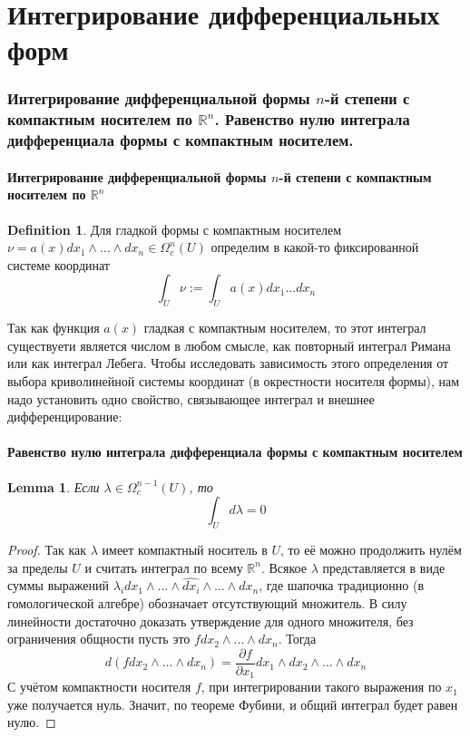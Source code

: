 \documentclass[a4paper,12pt]{article} %
\newtheorem{lemma}[theorem]{Lemma}
\theoremstyle{definition}
\newtheorem{definition}{Definition}[section]
\begin{document}
\part{Интегрирование дифференциальных форм}
\section{Интегрирование дифференциальной формы $n$-й степени с компактным носителем по $\mathbb{R}^n$. Равенство нулю интеграла дифференциала формы с компактным носителем.}
\subsection{Интегрирование дифференциальной формы $n$-й степени с компактным носителем по $\mathbb{R}^n$}
\begin{definition}
	Для гладкой формы с компактным носителем $\nu =a(x)dx_1\wedge \dots \wedge dx_n \in \Omega^n_c(U)$ определим в какой-то фиксированной системе координат
	\begin{equation}
		\int_U \nu :=  \int_U a(x) dx_1 \dots dx_n
	\end{equation}
\end{definition}
Так как функция $a(x)$ гладкая с компактным носителем, то этот интеграл существуети является числом в любом смысле, как повторный интеграл Римана или как интеграл Лебега. Чтобы исследовать зависимость этого определения от выбора криволинейной системы координат (в окрестности носителя формы), нам надо установить одно свойство, связывающее интеграл и внешнее дифференцирование:
\subsection{Равенство нулю интеграла дифференциала формы с компактным носителем}
\begin{lemma}
	Если $\lambda \in \Omega^{n-1}_c(U)$, то
	\begin{equation}
		\int_U d \lambda = 0
	\end{equation}
\end{lemma}
\begin{proof}
	Так как $\lambda$ имеет компактный носитель в $U$, то её можно продолжить нулём за пределы $U$ и считать интеграл по всему $\mathbb{R}^n$. Всякое $\lambda$ представляется в виде суммы выражений $\lambda_i dx_1 \wedge \dots  \wedge \widehat{dx_i} \wedge \dots \wedge dx_n$, где шапочка традиционно (в гомологической алгебре) обозначает отсутствующий множитель. В силу линейности достаточно доказать утверждение для одного множителя, без ограничения общности пусть это $fdx_2 \wedge \dots \wedge dx_n$. Тогда
	\begin{equation}
		d(fdx_2 \wedge \dots \wedge dx_n) = \frac{\partial f}{\partial x_1} dx_1 \wedge dx_2 \wedge \dots \wedge dx_n
	\end{equation}
	С учётом компактности носителя $f$, при интегрировании такого выражения по $x_1$ уже получается нуль. Значит, по теореме Фубини, и общий интеграл будет равен нулю.
\end{proof}
\end{document}
